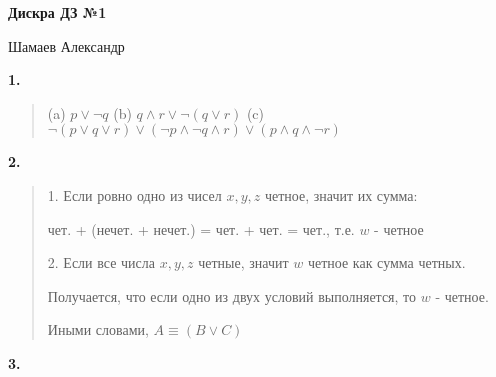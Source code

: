 \documentclass{article}
\begin{document}
\setlength{\parindent}{0pt}
\begin{Large}
    \textsf{\textbf{Дискра ДЗ №1}}
    
    Шамаев Александр    
\end{Large}
\vspace{1cm}

\textsf{\textbf{1.}}
\begin{quote}
\leftskip=0.2cm    
(a) $p \lor \neg q$ \quad
(b) $q \land r \lor \neg(q \lor r)$ \quad
(c) $\neg (p \lor q \lor r) \lor (\neg p \land \neg q \land r) \lor (p \land q \land \neg r)$ \\
\end{quote}

\textsf{\textbf{2.}}
\begin{quote}
\leftskip=0.2cm    
1. Если ровно одно из чисел $x, y, z$ четное, значит 
их сумма: 

чет. + (нечет. + нечет.) = чет. + чет. = чет., т.е. $w$ - четное

2. Если все числа $x, y, z$ четные, значит $w$ четное как сумма четных.

Получается, что если одно из двух условий выполняется, то $w$ - четное.

Иными словами, $A \equiv (B \lor C)$
\end{quote}
\textsf{\textbf{3.}}
\end{document}
